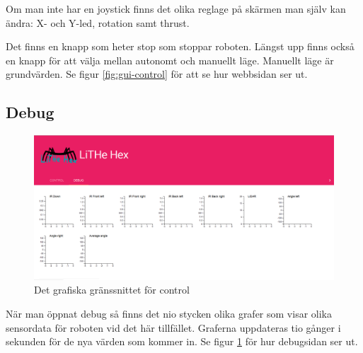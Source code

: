 \documentclass[a4paper,titlepage,12pt]{article}
\begin{document}
    Om man inte har en joystick finns det olika reglage på skärmen man själv kan
    ändra: X- och Y-led, rotation samt thrust.
	
	Det finns en knapp som heter stop som stoppar roboten. Längst upp finns
    också en knapp för att välja mellan autonomt och manuellt läge. Manuellt
    läge är grundvärden. Se figur \ref{fig:gui-control} för att se hur webbsidan
    ser ut.
	
    \newpage
	\subsection{Debug}\label{gui:debug}
	\begin{figure}[h]
		\centering
		\includegraphics[width=0.5\linewidth]{images/gui-debug.png}
		\caption{Det grafiska gränssnittet för control\label{fig:gui-debug}}
	\end{figure}
	När man öppnat debug så finns det nio stycken olika grafer som visar olika
    sensordata för roboten vid det här tillfället. Graferna uppdateras tio
    gånger i sekunden för de nya värden som kommer in. Se figur
    \ref{fig:gui-debug} för hur debugsidan ser ut.
	
\end{document}

